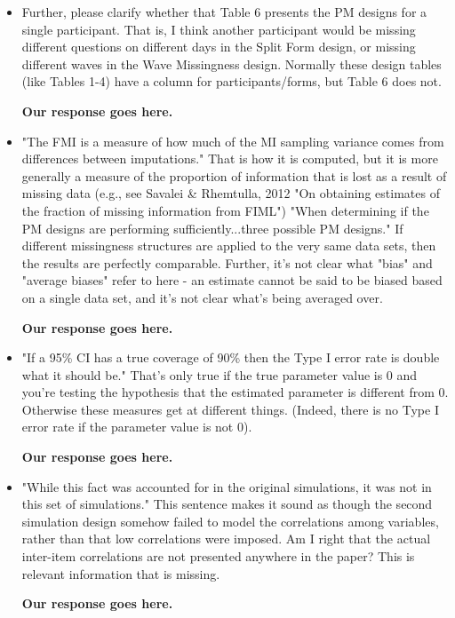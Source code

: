 \documentclass[letterpaper,12pt]{article}
\begin{document}
\begin{itemize}
{\bf Our response goes here.}

\item Further, please clarify whether that Table 6 presents the PM designs for a single participant. That is, I think another participant would be missing different questions on different days in the Split Form design, or missing different waves in the Wave Missingness design. Normally these design tables (like Tables 1-4) have a column for participants/forms, but Table 6 does not.

{\bf Our response goes here.}

\item "The FMI is a measure of how much of the MI sampling variance comes from differences between imputations." That is how it is computed, but it is more generally a measure of the proportion of information that is lost as a result of missing data (e.g., see Savalei & Rhemtulla, 2012 "On obtaining estimates of the fraction of missing information from FIML") "When determining if the PM designs are performing sufficiently...three possible PM designs." If different missingness structures are applied to the very same data sets, then the results are perfectly comparable. Further, it's not clear what "bias" and "average biases" refer to here - an estimate cannot be said to be biased based on a single data set, and it's not clear what's being averaged over. 

{\bf Our response goes here.}

\item "If a 95\% CI has a true coverage of 90\% then the Type I error rate is double what it should be." That's only true if the true parameter value is 0 and you're testing the hypothesis that the estimated parameter is different from 0. Otherwise these measures get at different things. (Indeed, there is no Type I error rate if the parameter value is not 0).

{\bf Our response goes here.}

\item "While this fact was accounted for in the original simulations, it was not in this set of simulations." This sentence makes it sound as though the second simulation design somehow failed to model the correlations among variables, rather than that low correlations were imposed. Am I right that the actual inter-item correlations are not presented anywhere in the paper? This is relevant information that is missing.

{\bf Our response goes here.}


\end{itemize}
\end{document}
